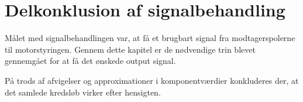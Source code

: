 \section{Delkonklusion af signalbehandling}\label{sec:delkonklusion_signal}
Målet med signalbehandlingen var, at få et brugbart signal fra modtagerspolerne til motorstyringen. Gennem dette kapitel er de nødvendige trin blevet gennemgået for at få det ønskede output signal.

På trods af afvigelser og approximationer i komponentværdier konkluderes der, at det samlede kredsløb virker efter hensigten.